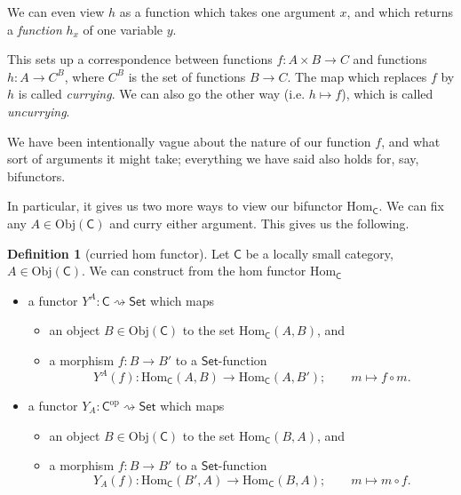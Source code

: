 \documentclass[a4paper,10pt]{scrreprt}
\newcommand{\Obj}{\mathrm{Obj}}
\newcommand{\Hom}{\mathrm{Hom}}
\theoremstyle{definition}
\newtheorem{definition}{Definition}[section]
\theoremstyle{plain}
\theoremstyle{remark}
\begin{document}
We can even view $h$ as a function which takes one argument $x$, and which returns a \emph{function} $h_{x}$ of one variable $y$.

This sets up a correspondence between functions $f\colon A \times B \to C$ and functions $h\colon A \to C^{B}$, where $C^{B}$ is the set of functions $B \to C$. The map which replaces $f$ by $h$ is called \emph{currying}. We can also go the other way (i.e. $h \mapsto f$), which is called \emph{uncurrying}.

We have been intentionally vague about the nature of our function $f$, and what sort of arguments it might take; everything we have said also holds for, say, bifunctors.

In particular, it gives us two more ways to view our bifunctor $\Hom_{\mathsf{C}}$. We can fix any $A \in \Obj(\mathsf{C})$ and curry either argument. This gives us the following.

\begin{definition}[curried hom functor]
  \label{def:curriedhomfunctor}
  Let $\mathsf{C}$ be a locally small category, $A \in \Obj(\mathsf{C})$. We can construct from the hom functor $\Hom_{\mathsf{C}}$
  \begin{itemize}
    \item a functor $Y^{A}\colon \mathsf{C} \rightsquigarrow \mathsf{Set}$ which maps
      \begin{itemize}
        \item an object $B \in \Obj(\mathsf{C})$ to the set $\Hom_{\mathsf{C}}(A, B)$, and

        \item a morphism $f\colon B \to B'$ to a $\mathsf{Set}$-function
          \begin{equation*}
            Y^{A}(f)\colon \Hom_{\mathsf{C}}(A, B) \to \Hom_{\mathsf{C}}(A, B'); \qquad m \mapsto f \circ m.
          \end{equation*} 
      \end{itemize}

    \item a functor $Y_{A}\colon \mathsf{C}^{\mathrm{op}} \rightsquigarrow \mathsf{Set}$ which maps
      \begin{itemize}
        \item an object $B \in \Obj(\mathsf{C})$ to the set $\Hom_{\mathsf{C}}(B, A)$, and

        \item a morphism $f\colon B \to B'$ to a $\mathsf{Set}$-function
          \begin{equation*}
            Y_{A}(f)\colon \Hom_{\mathsf{C}}(B', A) \to \Hom_{\mathsf{C}}(B, A); \qquad m \mapsto m \circ f.
          \end{equation*} 
      \end{itemize}
  \end{itemize}
\end{definition}
\end{document}
